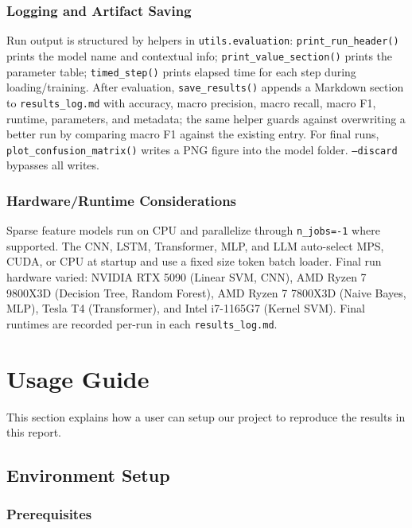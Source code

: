 \documentclass[12pt]{article}
\begin{document}
\subsubsection{Logging and Artifact Saving}

Run output is structured by helpers in \texttt{utils.evaluation}: \texttt{print\_run\_header()} prints the model name and contextual info; \texttt{print\_value\_section()} prints the parameter table; \texttt{timed\_step()} prints elapsed time for each step during loading/training. After evaluation, \texttt{save\_results()} appends a Markdown section to \texttt{results\_log.md} with accuracy, macro precision, macro recall, macro F1, runtime, parameters, and metadata; the same helper guards against overwriting a better run by comparing macro F1 against the existing entry. For final runs, \texttt{plot\_confusion\_matrix()} writes a PNG figure into the model folder. \texttt{--discard} bypasses all writes.

\subsubsection{Hardware/Runtime Considerations}

Sparse feature models run on CPU and parallelize through \texttt{n\_jobs=-1} where supported. The CNN, LSTM, Transformer, MLP, and LLM auto-select MPS, CUDA, or CPU at startup and use a fixed size token batch loader. Final run hardware varied: NVIDIA RTX 5090 (Linear SVM, CNN), AMD Ryzen 7 9800X3D (Decision Tree, Random Forest), AMD Ryzen 7 7800X3D (Naive Bayes, MLP), Tesla T4 (Transformer), and Intel i7-1165G7 (Kernel SVM). Final runtimes are recorded per-run in each \texttt{results\_log.md}.

\section{Usage Guide}

This section explains how a user can setup our project to reproduce the results in this report.

\subsection{Environment Setup}

\subsubsection{Prerequisites}
\end{document}
